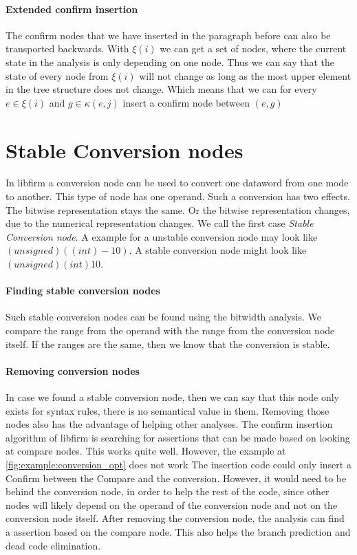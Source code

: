 \paragraph{Extended confirm insertion}
The confirm nodes that we have inserted in the paragraph before can also be transported backwards.
With $\xi(i)$ we can get a set of nodes, where the current state in the analysis is only depending on one node. Thus we can say that the state of every node from $\xi(i)$ will not change as long as the most upper element in the tree structure does not change. Which means that we can for every $e \in \xi(i)$ and $g \in \kappa(e, j)$ insert a confirm node between $(e,g)$

\section{Stable Conversion nodes}
In libfirm a conversion node can be used to convert one dataword from one mode to another. This type of node has one operand. Such a conversion has two effects. The bitwise representation stays the same. Or the bitwise representation changes, due to the numerical representation changes. We call the first case \textit{Stable Conversion node}.  A example for a unstable conversion node may look like $(unsigned)((int)-10)$. A stable conversion node might look like $(unsigned)(int)10$.

\paragraph{Finding stable conversion nodes}
Such stable conversion nodes can be found using the bitwidth analysis. We compare the range from the operand with the range from the conversion node itself. If the ranges are the same, then we know that the conversion is stable.

\paragraph{Removing conversion nodes}

In case we found a stable conversion node, then we can say that this node only exists for syntax rules, there is no semantical value in them. Removing those nodes also has the advantage of helping other analyses. The confirm insertion algorithm of libfirm is searching for assertions that can be made based on looking at compare nodes. This works quite well. However, the example at \autoref{fig:example:conversion_opt} does not work
The insertion code could only insert a Confirm between the Compare and the conversion. However, it would need to be behind the conversion node, in order to help the rest of the code, since other nodes will likely depend on the operand of the conversion node and not on the conversion node itself. 
After removing the conversion node, the analysis can find a assertion based on the compare node. This also helps the branch prediction and dead code elimination.

